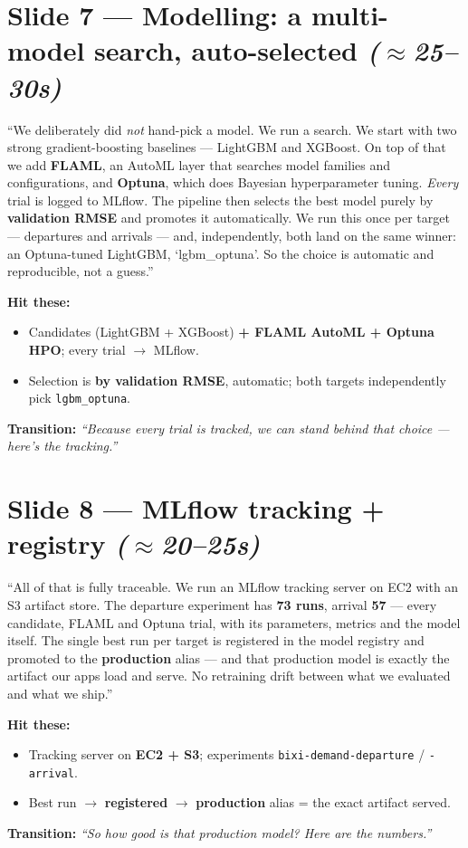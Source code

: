 \documentclass[11pt]{article}
\newcommand{\arr}{$\rightarrow$}
\newcommand{\approxx}{$\approx$}
\newcommand{\timing}[1]{\hfill{\normalsize\itshape\color{slate}(#1)}}
\newcommand{\hit}{\smallskip\noindent\textbf{\color{ink}Hit these:}}
\newcommand{\trans}[1]{\smallskip\noindent\textbf{\color{bixired}Transition:} \emph{#1}}
\begin{document}
\section{Slide 7 --- Modelling: a multi-model search, auto-selected \timing{\approxx 25--30s}}
\begin{say}
``We deliberately did \emph{not} hand-pick a model. We run a search. We start with two strong
gradient-boosting baselines --- LightGBM and XGBoost. On top of that we add \textbf{FLAML}, an AutoML
layer that searches model families and configurations, and \textbf{Optuna}, which does Bayesian
hyperparameter tuning. \emph{Every} trial is logged to MLflow. The pipeline then selects the best model
purely by \textbf{validation RMSE} and promotes it automatically. We run this once per target ---
departures and arrivals --- and, independently, both land on the same winner: an Optuna-tuned LightGBM,
`lgbm\_optuna'. So the choice is automatic and reproducible, not a guess.''
\end{say}
\hit
\begin{itemize}
  \item Candidates (LightGBM + XGBoost) \textbf{+ FLAML AutoML + Optuna HPO}; every trial \arr{} MLflow.
  \item Selection is \textbf{by validation RMSE}, automatic; both targets independently pick \texttt{lgbm\_optuna}.
\end{itemize}
\trans{``Because every trial is tracked, we can stand behind that choice --- here's the tracking.''}

\section{Slide 8 --- MLflow tracking + registry \timing{\approxx 20--25s}}
\begin{say}
``All of that is fully traceable. We run an MLflow tracking server on EC2 with an S3 artifact store. The
departure experiment has \textbf{73 runs}, arrival \textbf{57} --- every candidate, FLAML and Optuna trial,
with its parameters, metrics and the model itself. The single best run per target is registered in the
model registry and promoted to the \textbf{production} alias --- and that production model is exactly the
artifact our apps load and serve. No retraining drift between what we evaluated and what we ship.''
\end{say}
\hit
\begin{itemize}
  \item Tracking server on \textbf{EC2 + S3}; experiments \texttt{bixi-demand-departure} / \texttt{-arrival}.
  \item Best run \arr{} \textbf{registered} \arr{} \textbf{production} alias = the exact artifact served.
\end{itemize}
\trans{``So how good is that production model? Here are the numbers.''}
\end{document}
